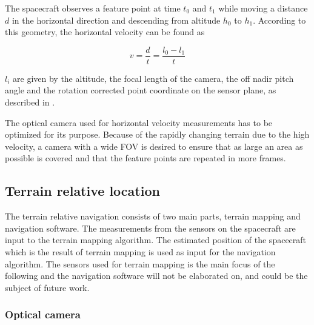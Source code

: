 The spacecraft observes a feature point at time $t_0$ and $t_1$ while moving a distance $d$ in the horizontal direction and descending from altitude $h_0$ to $h_1$. According to this geometry, the horizontal velocity can be found as

\begin{equation}
v=\dfrac{d}{t}=\dfrac{l_0-l_1}{t}
\end{equation}

$l_i$ are given by the altitude, the focal length of the camera, the off nadir pitch angle and the rotation corrected point coordinate on the sensor plane, as described in \cite{alessandro}.


The optical camera used for horizontal velocity measurements has to be optimized for its purpose. Because of the rapidly changing terrain due to the high velocity, a camera with a wide FOV is desired to ensure that as large an area as possible is covered and that the feature points are repeated in more frames.


\subsection{Terrain relative location}


The terrain relative navigation consists of two main parts, terrain mapping and navigation software.
The measurements from the sensors on the spacecraft are input to the terrain mapping algorithm. The estimated position of the spacecraft which is the result of terrain mapping is used as input for the navigation algorithm. The sensors used for terrain mapping is the main focus of the following and the navigation software will not be elaborated on, and could be the subject of future work. 


\subsubsection{Optical camera}


